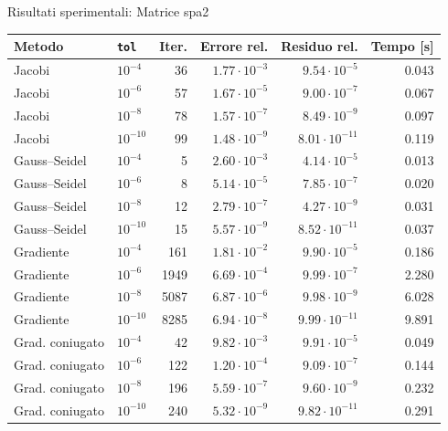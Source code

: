 \documentclass[11pt,aspectratio=169,xcolor=dvipsnames]{beamer}
\begin{document}
\begin{frame}{Risultati sperimentali: Matrice spa2}
    \begin{table}
        \centering
        \scriptsize
        \begin{tabular}{llrrrr}
        \toprule
        Metodo & \texttt{tol} & Iter. & Errore rel. & Residuo rel. & Tempo [s] \\
        \midrule
        Jacobi & $10^{-4}$ & 36 & $1.77\cdot10^{-3}$ & $9.54\cdot10^{-5}$ & 0.043 \\
        Jacobi & $10^{-6}$ & 57 & $1.67\cdot10^{-5}$ & $9.00\cdot10^{-7}$ & 0.067 \\
        Jacobi & $10^{-8}$ & 78 & $1.57\cdot10^{-7}$ & $8.49\cdot10^{-9}$ & 0.097 \\
        Jacobi & $10^{-10}$ & 99 & $1.48\cdot10^{-9}$ & $8.01\cdot10^{-11}$ & 0.119 \\
        \midrule
        Gauss--Seidel & $10^{-4}$ & 5 & $2.60\cdot10^{-3}$ & $4.14\cdot10^{-5}$ & 0.013 \\
        Gauss--Seidel & $10^{-6}$ & 8 & $5.14\cdot10^{-5}$ & $7.85\cdot10^{-7}$ & 0.020 \\
        Gauss--Seidel & $10^{-8}$ & 12 & $2.79\cdot10^{-7}$ & $4.27\cdot10^{-9}$ & 0.031 \\
        Gauss--Seidel & $10^{-10}$ & 15 & $5.57\cdot10^{-9}$ & $8.52\cdot10^{-11}$ & 0.037 \\
        \midrule
        Gradiente & $10^{-4}$ & 161 & $1.81\cdot10^{-2}$ & $9.90\cdot10^{-5}$ & 0.186 \\
        Gradiente & $10^{-6}$ & 1949 & $6.69\cdot10^{-4}$ & $9.99\cdot10^{-7}$ & 2.280 \\
        Gradiente & $10^{-8}$ & 5087 & $6.87\cdot10^{-6}$ & $9.98\cdot10^{-9}$ & 6.028 \\
        Gradiente & $10^{-10}$ & 8285 & $6.94\cdot10^{-8}$ & $9.99\cdot10^{-11}$ & 9.891 \\
        \midrule
        Grad. coniugato & $10^{-4}$ & 42 & $9.82\cdot10^{-3}$ & $9.91\cdot10^{-5}$ & 0.049 \\
        Grad. coniugato & $10^{-6}$ & 122 & $1.20\cdot10^{-4}$ & $9.09\cdot10^{-7}$ & 0.144 \\
        Grad. coniugato & $10^{-8}$ & 196 & $5.59\cdot10^{-7}$ & $9.60\cdot10^{-9}$ & 0.232 \\
        Grad. coniugato & $10^{-10}$ & 240 & $5.32\cdot10^{-9}$ & $9.82\cdot10^{-11}$ & 0.291 \\
        \bottomrule
        \end{tabular}
    \end{table}
\end{frame}
\end{document}
